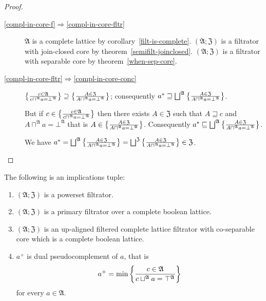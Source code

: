 \begin{proof}
~
\begin{description}
\item [{\ref{compl-in-core-f}$\Rightarrow$\ref{compl-in-core-fltr}}] $\mathfrak{A}$
is a complete lattice by corollary~\ref{filt-is-complete}. $(\mathfrak{A};\mathfrak{Z})$
is a filtrator with join-closed core by theorem~\ref{semifilt-joinclosed}.
$(\mathfrak{A};\mathfrak{Z})$ is a filtrator with separable core
by theorem~\ref{when-sep-core}.
\item [{\ref{compl-in-core-fltr}$\Rightarrow$\ref{compl-in-core-conc}}] $\left\{ \frac{c\in\mathfrak{A}}{c\sqcap^{\mathfrak{A}}a=\bot^{\mathfrak{A}}}\right\}\supseteq\left\{ \frac{A\in\mathfrak{Z}}{A\sqcap^{\mathfrak{A}}a=\bot^{\mathfrak{A}}}\right\}$;
consequently $a^{\ast}\sqsupseteq\bigsqcup^{\mathfrak{A}}\left\{ \frac{A\in\mathfrak{Z}}{A\sqcap^{\mathfrak{A}}a=\bot^{\mathfrak{A}}}\right\}$.


But if $c\in\left\{ \frac{c\in\mathfrak{A}}{c\sqcap^{\mathfrak{A}}a=\bot^{\mathfrak{A}}}\right\}$
then there exists $A\in\mathfrak{Z}$ such that $A\sqsupseteq c$
and $A\sqcap^{\mathfrak{A}}a=\bot^{\mathfrak{A}}$ that is $A\in\left\{ \frac{A\in\mathfrak{Z}}{A\sqcap^{\mathfrak{A}}a=\bot^{\mathfrak{A}}}\right\}$.
Consequently $a^{\ast}\sqsubseteq\bigsqcup^{\mathfrak{A}}\left\{ \frac{A\in\mathfrak{Z}}{A\sqcap^{\mathfrak{A}}a=\bot^{\mathfrak{A}}}\right\}$.


We have $a^{\ast}=\bigsqcup^{\mathfrak{A}}\left\{ \frac{A\in\mathfrak{Z}}{A\sqcap^{\mathfrak{A}}a=\bot^{\mathfrak{A}}}\right\}=\bigsqcup^{\mathfrak{Z}}\left\{ \frac{A\in\mathfrak{Z}}{A\sqcap^{\mathfrak{A}}a=\bot^{\mathfrak{A}}}\right\}\in\mathfrak{Z}$.

\end{description}
\end{proof}
\begin{thm}
\label{dual-compl-pseudo}The following is an implications tuple:
\begin{enumerate}
\item \label{dual-compl-pseudo-p}$(\mathfrak{A};\mathfrak{Z})$ is a powerset
filtrator.
\item \label{dual-compl-pseudo-f}$(\mathfrak{A};\mathfrak{Z})$ is a primary
filtrator over a complete boolean lattice.
\item \label{dual-compl-pseudo-fltr}$(\mathfrak{A};\mathfrak{Z})$ is an
up-aligned filtered complete lattice filtrator with co-separable core
which is a complete boolean lattice.
\item \label{dual-compl-pseudo-conc}$a^{+}$ is dual pseudocomplement of
$a$, that is
\[
a^{+}=\min\left\{ \frac{c\in\mathfrak{A}}{c\sqcup^{\mathfrak{A}}a=\top^{\mathfrak{A}}}\right\}
\]
for every $a\in\mathfrak{A}$.
\end{enumerate}
\end{thm}
